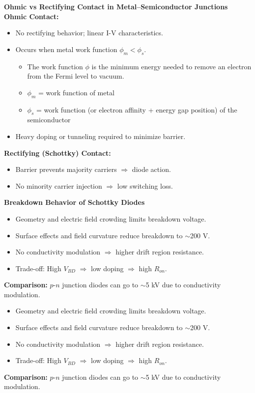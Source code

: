 \begin{frame}{\textbf{Ohmic vs Rectifying Contact in Metal–Semiconductor Junctions}}
    \textbf{Ohmic Contact:}
    \begin{itemize}
        \item No rectifying behavior; linear I-V characteristics.
        \item Occurs when metal work function $\phi_m < \phi_s$.
        \begin{itemize}
        \item The work function $\phi$ is the minimum energy needed to remove an electron from the Fermi level to vacuum.
        \item $\phi_m$ = work function of metal
        \item $\phi_s$ = work function (or electron affinity + energy gap position) of the semiconductor
    \end{itemize}
        \item Heavy doping or tunneling required to minimize barrier.
    \end{itemize}
    
    \textbf{Rectifying (Schottky) Contact:}
    \begin{itemize}
        \item Barrier prevents majority carriers $\Rightarrow$ diode action.
        \item No minority carrier injection $\Rightarrow$ low switching loss.
    \end{itemize}

\end{frame}

\begin{frame}{\textbf{Breakdown Behavior of Schottky Diodes}}
    \begin{itemize}
        \item Geometry and electric field crowding limits breakdown voltage.
        \item Surface effects and field curvature reduce breakdown to $\sim$200 V.
        \item No conductivity modulation $\Rightarrow$ higher drift region resistance.
        \item Trade-off: High $V_{BD}$ $\Rightarrow$ low doping $\Rightarrow$ high $R_{on}$.
    \end{itemize}
    \textbf{Comparison:} $p$-$n$ junction diodes can go to $\sim$5 kV due to conductivity modulation.
    \begin{itemize}
        \item Geometry and electric field crowding limits breakdown voltage.
        \item Surface effects and field curvature reduce breakdown to $\sim$200 V.
        \item No conductivity modulation $\Rightarrow$ higher drift region resistance.
        \item Trade-off: High $V_{BD}$ $\Rightarrow$ low doping $\Rightarrow$ high $R_{on}$.
    \end{itemize}
    \textbf{Comparison:} $p$-$n$ junction diodes can go to $\sim$5 kV due to conductivity modulation.
\end{frame}

